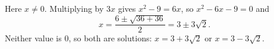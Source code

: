Here $x\ne0$. Multiplying by $3x$ gives $x^2-9=6x$, so $x^2-6x-9=0$ and
\[
x=\dfrac{6\pm\sqrt{36+36}}{2}=3\pm3\sqrt2 .
\]
Neither value is $0$, so both are solutions: $\boxed{x=3+3\sqrt2\text{ or }x=3-3\sqrt2}$.
